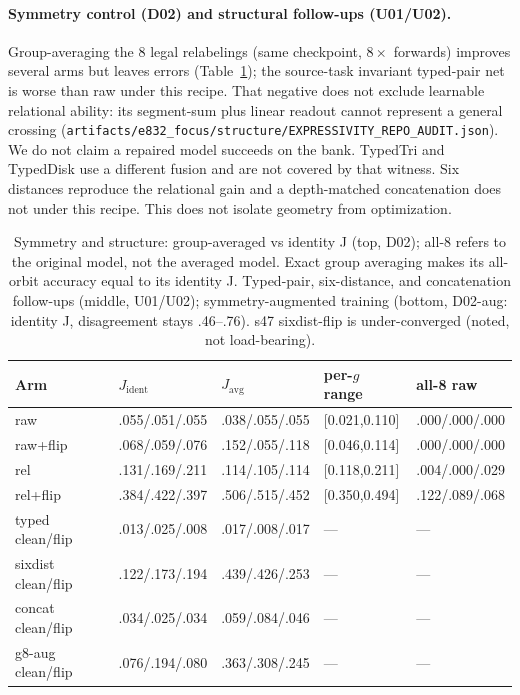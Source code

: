 \paragraph{Symmetry control (D02) and structural follow-ups (U01/U02).} Group-averaging the 8 legal relabelings (same checkpoint, $8\times$ forwards) improves several arms but leaves errors (Table~\ref{tab:d02}); the source-task invariant typed-pair net is worse than raw under this recipe. That negative does not exclude learnable relational ability: its segment-sum plus linear readout cannot represent a general crossing (\texttt{artifacts/e832\_focus/structure/EXPRESSIVITY\_REPO\_AUDIT.json}). We do not claim a repaired model succeeds on the bank. TypedTri and TypedDisk use a different fusion and are not covered by that witness. Six distances reproduce the relational gain and a depth-matched concatenation does not under this recipe. This does not isolate geometry from optimization.
\begin{table}[t]
\centering
\small
\begin{tabular}{@{}lllll@{}}
\toprule
Arm & $J_{\mathrm{ident}}$ & $J_{\mathrm{avg}}$ & per-\(g\) range & all-8 raw \\
\midrule
raw & .055/.051/.055 & .038/.055/.055 & [0.021,0.110] & .000/.000/.000 \\
raw+flip & .068/.059/.076 & .152/.055/.118 & [0.046,0.114] & .000/.000/.000 \\
rel & .131/.169/.211 & .114/.105/.114 & [0.118,0.211] & .004/.000/.029 \\
rel+flip & .384/.422/.397 & .506/.515/.452 & [0.350,0.494] & .122/.089/.068 \\
typed clean/flip & .013/.025/.008 & .017/.008/.017 & --- & --- \\
sixdist clean/flip & .122/.173/.194 & .439/.426/.253 & --- & --- \\
concat clean/flip & .034/.025/.034 & .059/.084/.046 & --- & --- \\
g8-aug clean/flip & .076/.194/.080 & .363/.308/.245 & --- & --- \\
\bottomrule
\end{tabular}
\caption{Symmetry and structure: group-averaged vs identity J (top, D02); all-8 refers to the original model, not the averaged model. Exact group averaging makes its all-orbit accuracy equal to its identity J. Typed-pair, six-distance, and concatenation follow-ups (middle, U01/U02); symmetry-augmented training (bottom, D02-aug: identity J, disagreement stays .46--.76). s47 sixdist-flip is under-converged (noted, not load-bearing).}
\label{tab:d02}
\end{table}
